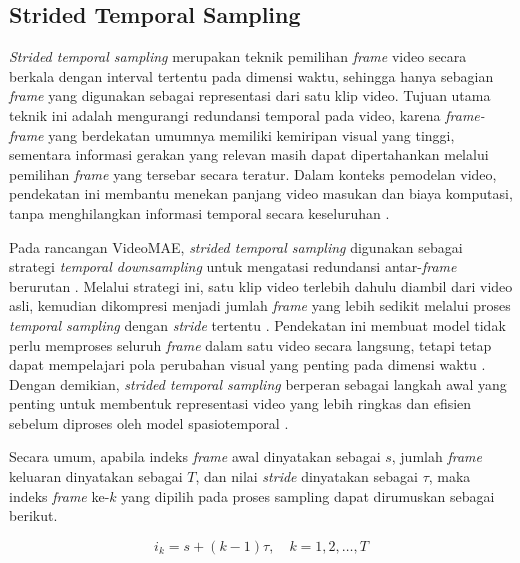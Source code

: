 \subsection{Strided Temporal Sampling} \label{II.Teori6.1}
\textit{Strided temporal sampling} merupakan teknik pemilihan \textit{frame} video secara berkala dengan interval tertentu pada dimensi waktu, sehingga hanya sebagian \textit{frame} yang digunakan sebagai representasi dari satu klip video. Tujuan utama teknik ini adalah mengurangi redundansi temporal pada video, karena \textit{frame-frame} yang berdekatan umumnya memiliki kemiripan visual yang tinggi, sementara informasi gerakan yang relevan masih dapat dipertahankan melalui pemilihan \textit{frame} yang tersebar secara teratur. Dalam konteks pemodelan video, pendekatan ini membantu menekan panjang video masukan dan biaya komputasi, tanpa menghilangkan informasi temporal secara keseluruhan \cite{tong2022videomaemaskedautoencodersdataefficient,bertasius2021spacetimeattentionneedvideo,arnab2021vivitvideovisiontransformer}. \par

Pada rancangan VideoMAE, \textit{strided temporal sampling} digunakan sebagai strategi \textit{temporal downsampling} untuk mengatasi redundansi antar-\textit{frame} berurutan \cite{tong2022videomaemaskedautoencodersdataefficient}. Melalui strategi ini, satu klip video terlebih dahulu diambil dari video asli, kemudian dikompresi menjadi jumlah \textit{frame} yang lebih sedikit melalui proses \textit{temporal sampling} dengan \textit{stride} tertentu \cite{tong2022videomaemaskedautoencodersdataefficient}. Pendekatan ini membuat model tidak perlu memproses seluruh \textit{frame} dalam satu video secara langsung, tetapi tetap dapat mempelajari pola perubahan visual yang penting pada dimensi waktu \cite{tong2022videomaemaskedautoencodersdataefficient}. Dengan demikian, \textit{strided temporal sampling} berperan sebagai langkah awal yang penting untuk membentuk representasi video yang lebih ringkas dan efisien sebelum diproses oleh model spasiotemporal \cite{tong2022videomaemaskedautoencodersdataefficient}. \par

Secara umum, apabila indeks \textit{frame} awal dinyatakan sebagai $s$, jumlah \textit{frame} keluaran dinyatakan sebagai $T$, dan nilai \textit{stride} dinyatakan sebagai $\tau$, maka indeks \textit{frame} ke-$k$ yang dipilih pada proses sampling dapat dirumuskan sebagai berikut.

\vspace{0.5\baselineskip}
\begin{equation}
i_k = s + (k-1)\tau, \quad k = 1,2,\ldots,T
\label{eq:strided-index}
\end{equation}
\vspace{0.5\baselineskip}

